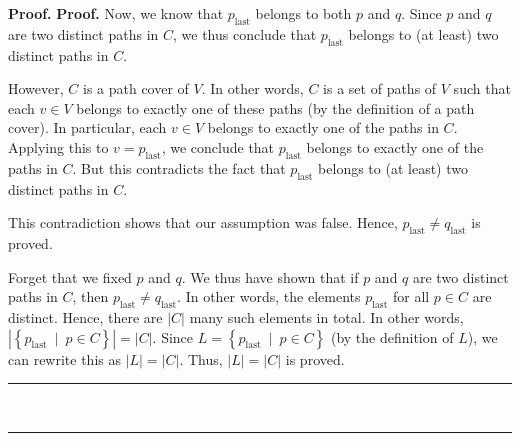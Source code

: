 \documentclass[numbers=enddot,12pt,final,onecolumn,notitlepage]{scrartcl}%
\numberwithin{exer}{section}
\theoremstyle{definition}
\newenvironment{proof}[1][Proof]{\noindent\textbf{#1.} }{\ \rule{0.5em}{0.5em}}
\newenvironment{verlong}{}{}
\begin{document}
\begin{verlong}
\begin{proof}
\begin{proof}
Now, we know that $p_{\operatorname*{last}}$ belongs to both $p$ and $q$.
Since $p$ and $q$ are two distinct paths in $C$, we thus conclude that
$p_{\operatorname*{last}}$ belongs to (at least) two distinct paths in $C$.

However, $C$ is a path cover of $V$. In other words, $C$ is a set of paths of
$V$ such that each $v\in V$ belongs to exactly one of these paths (by the
definition of a path cover). In particular, each $v\in V$ belongs to exactly
one of the paths in $C$. Applying this to $v=p_{\operatorname*{last}}$, we
conclude that $p_{\operatorname*{last}}$ belongs to exactly one of the paths
in $C$. But this contradicts the fact that $p_{\operatorname*{last}}$ belongs
to (at least) two distinct paths in $C$.

This contradiction shows that our assumption was false. Hence,
$p_{\operatorname*{last}}\neq q_{\operatorname*{last}}$ is proved.

Forget that we fixed $p$ and $q$. We thus have shown that if $p$ and $q$ are
two distinct paths in $C$, then $p_{\operatorname*{last}}\neq
q_{\operatorname*{last}}$. In other words, the elements
$p_{\operatorname*{last}}$ for all $p\in C$ are distinct. Hence, there are
$\left\vert C\right\vert $ many such elements in total. In other words,
$\left\vert \left\{  p_{\operatorname*{last}}\ \mid\ p\in C\right\}
\right\vert =\left\vert C\right\vert $. Since $L=\left\{
p_{\operatorname*{last}}\ \mid\ p\in C\right\}  $ (by the definition of $L$),
we can rewrite this as $\left\vert L\right\vert =\left\vert C\right\vert $.
Thus, $\left\vert L\right\vert =\left\vert C\right\vert $ is proved.
\end{proof}


\end{proof}
\end{verlong}
\end{document}
